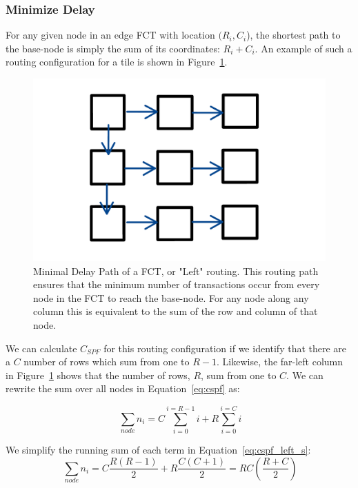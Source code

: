 \subsubsection{Minimize Delay}
\label{sec:min_comm}
For any given node in an edge FCT with location $(R_{i},C_{i}$), the shortest path to the base-node is simply the sum of its coordinates: $R_{i}+C_{i}$.
An example of such a routing configuration for a tile is shown in Figure~\ref{fig:leftroute}.

\begin{figure}[]
\centering
\includegraphics[width=\textwidth]{images/leftroute.pdf}
\caption{Minimal Delay Path of a FCT, or "Left" routing.
This routing path ensures that the minimum number of transactions occur from every node in the FCT to reach the base-node.
For any node along any column this is equivalent to the sum of the row and column of that node.}
\label{fig:leftroute}
\end{figure}

We can calculate $C_{SPF}$ for this routing configuration if we identify that there are a $C$ number of rows which sum from one to $R-1$.
Likewise, the far-left column in Figure~\ref{fig:leftroute} shows that the number of rows, $R$, sum from one to $C$.
We can rewrite the sum over all nodes in Equation~\ref{eq:cspf} as:

\begin{equation}~\label{eq:cspf_left_s}
  \sum_{node}n_{i} = C\sum_{i=0}^{i=R-1}i + R\sum_{i=0}^{i=C}i
\end{equation}

We simplify the running sum of each term in Equation~\ref{eq:cspf_left_s}:
\begin{equation}~\label{eq:cspf_left_e}
  \sum_{node}n_{i} = C\frac{R(R-1)}{2} + R\frac{C(C+1)}{2} = RC(\frac{R+C}{2})
\end{equation}

